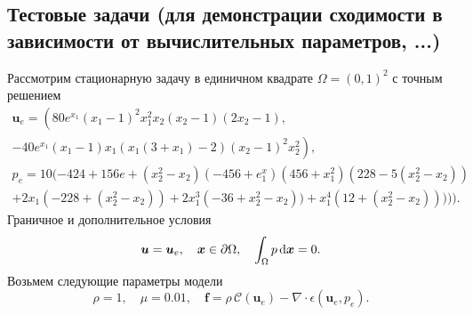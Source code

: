 \documentclass[a4paper,10pt]{report}
\begin{document}
\subsection{Тестовые задачи (для демонстрации сходимости в зависимости от вычислительных параметров, ...)}
Рассмотрим стационарную задачу в единичном квадрате $\Omega=(0,1)^2$ с точным решением
\begin{equation}
\begin{gathered}
\bm{u}_e = \left(80 e^{x_1}(x_1 - 1)^2 x_1^2 x_2 (x_2 -  1) (2 x_2 - 1),\right.\\
\left. -40 e^{x_1} (x_1 - 1) x_1 (x_1 (3 + x_1) - 2) (x_2-1)^2 x_2^2\right), \\
p_e = 10 (-424 + 156 e + (x_2^2-x_2) (-456 + e^x_1) (456 + x_1^2) (228 - 5 (x_2^2 - x_2)) \\
+ 2 x_1 (-228 + (x_2^2 - x_2)) + 2 x_1^3 (-36 + x_2^2 - x_2)) + x_1^4 (12 + (x_2^2 - x_2))))).
\end{gathered}
\label{eq:shiftedvortex}
\end{equation}
Граничное и дополнительное условия
\[
    \bm{u} = \bm{u}_e, \quad \bm{x} \in \partial \Omega, \quad \int_\Omega p \,{\rm d}\bm{x} = 0.
\]
Возьмем следующие параметры модели
\[
\rho = 1, \quad \mu = 0.01, \quad \bm{f} = \rho \,\mathcal{C}(\bm{u}_e) - \nabla \cdot \epsilon(\bm{u}_e, p_e).
\]
\end{document}
